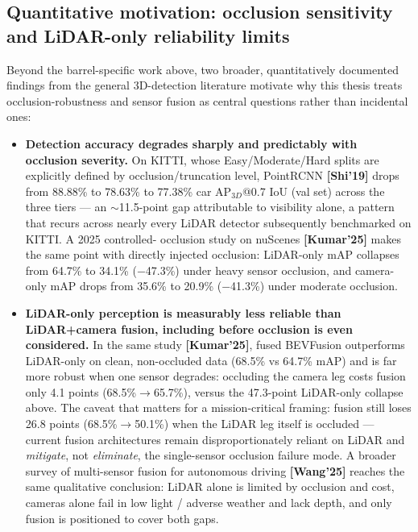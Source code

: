 \documentclass[10pt,a4paper]{article}
\begin{document}
\subsection{Quantitative motivation: occlusion sensitivity and LiDAR-only reliability
limits}

Beyond the barrel-specific work above, two broader, quantitatively documented findings
from the general 3D-detection literature motivate why this thesis treats
occlusion-robustness and sensor fusion as central questions rather than incidental ones:

\begin{itemize}[leftmargin=1.4em,itemsep=3pt,topsep=2pt]
  \item \textbf{Detection accuracy degrades sharply and predictably with occlusion
  severity.} On KITTI, whose Easy/Moderate/Hard splits are explicitly defined by
  occlusion/truncation level, PointRCNN \textbf{[Shi'19]} drops from 88.88\% to 78.63\% to
  77.38\% car AP$_{3D}$@0.7 IoU (val set) across the three tiers --- an
  $\sim$11.5-point gap attributable to visibility alone, a pattern that recurs across
  nearly every LiDAR detector subsequently benchmarked on KITTI. A 2025 controlled-
  occlusion study on nuScenes \textbf{[Kumar'25]} makes the same point with directly
  injected occlusion: LiDAR-only mAP collapses from 64.7\% to 34.1\% ($-$47.3\%) under
  heavy sensor occlusion, and camera-only mAP drops from 35.6\% to 20.9\% ($-$41.3\%)
  under moderate occlusion.

  \item \textbf{LiDAR-only perception is measurably less reliable than LiDAR+camera
  fusion, including before occlusion is even considered.} In the same study
  \textbf{[Kumar'25]}, fused BEVFusion outperforms LiDAR-only on clean, non-occluded data
  (68.5\% vs 64.7\% mAP) and is far more robust when one sensor degrades: occluding the
  camera leg costs fusion only 4.1 points (68.5\%$\to$65.7\%), versus the 47.3-point
  LiDAR-only collapse above. The caveat that matters for a mission-critical framing:
  fusion still loses 26.8 points (68.5\%$\to$50.1\%) when the LiDAR leg itself is
  occluded --- current fusion architectures remain disproportionately reliant on LiDAR
  and \emph{mitigate}, not \emph{eliminate}, the single-sensor occlusion failure mode. A
  broader survey of multi-sensor fusion for autonomous driving \textbf{[Wang'25]} reaches
  the same qualitative conclusion: LiDAR alone is limited by occlusion and cost, cameras
  alone fail in low light / adverse weather and lack depth, and only fusion is positioned
  to cover both gaps.
\end{itemize}
\end{document}
